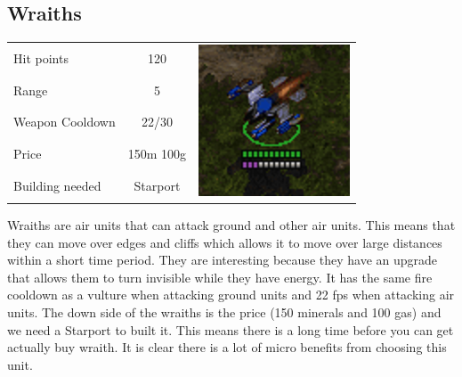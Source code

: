 \subsection{Wraiths}
\begin{table}[H]
	\begin{tabular}{| l | c | c}
		\cline{1-2}
		Hit points		& 120		&\multirow{5}{*}{\includegraphics[scale=.4]
									{Figures/Units/wraith.png}}	\\ \cline{1-2}
		Range			& 5 		&\\ \cline{1-2}
		Weapon Cooldown	& 22/30	 	&\\ \cline{1-2}
		Price			& 150m 100g	&\\ \cline{1-2}
		Building needed	& Starport	&\\ \cline{1-2}
	\end{tabular}
\end{table}
Wraiths are air units that can attack ground and other air units. This means that they can move over edges and cliffs which allows it
to move over large distances within a short time period. They are interesting because they have an upgrade that allows them to turn invisible while they have energy. It has the same fire cooldown
as a vulture when attacking ground units and 22 fps when attacking air units.  
The down side of the wraiths is the price (150 minerals and 100 gas) and we need a Starport to built it. This means
there is a long time before you can get actually buy wraith. It is clear there is a lot of micro benefits from choosing this unit. 


